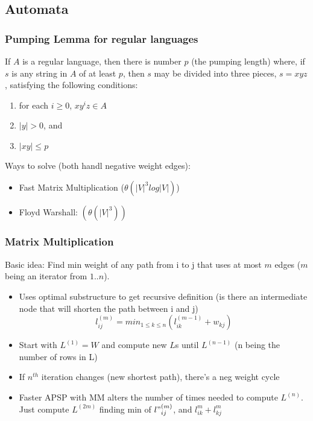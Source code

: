 \documentclass[7pt]{article}
\begin{document}
\begin{multicols*}{4}
\subsection*{Automata}

\subsubsection*{Pumping Lemma for regular languages}
If $A$ is a regular language, then there is number $p$ (the pumping length) where, if $s$ is any string in $A$ of at least $p$, then $s$ may be divided into three pieces, $s = xyz$, satisfying the following conditions:
\begin{enumerate}
\item for each $i \geq 0$, $xy^iz \in A$
\item $|y| > 0$, and
\item $|xy| \leq p$
\end{enumerate}

Ways to solve (both handl negative weight edges): 
\begin{itemize}
\item Fast Matrix Multiplication ($\theta(|V|^3log|V|)$)
\item Floyd Warshall: $(\theta(|V|^3))$
\end{itemize}

\subsubsection*{Matrix Multiplication}
Basic idea: Find min weight of any path from i to j that uses at most
$m$ edges ($m$ being an iterator from $1..n$).  

\begin{itemize}
\item Uses optimal substructure to get recursive definition (is there
  an intermediate node that will shorten the path between i and j)
\begin{equation} l_{ij}^{(m)} = min_{1 \leq k \leq n}(l_{ik}^{(m-1)} +
  w_{kj})\end{equation}
\item Start with $L^{(1)} = W$ and compute new $L$s until $L^{(n-1)}$
  (n being the number of rows in L) 
\item  If $n^{th}$ iteration changes (new shortest path), there's a
  neg weight cycle
\item Faster APSP with MM alters the number of times needed to compute
  $L^{(n)}$.  Just compute $L^{(2m)}$ finding min of $l"_{ij}^{(m)}$,
  and $l_{ik}^{m} + l_{kj}^{m}$
\end{itemize}


\end{multicols*}
\end{document}
